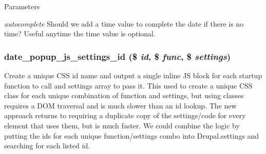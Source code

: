 \begin{DoxyParams}{Parameters}
\item[{\em autocomplete}]Should we add a time value to complete the date if there is no time? Useful anytime the time value is optional. \end{DoxyParams}
\hypertarget{date__popup_8module_a8077608506edf747245df8c1192706c8}{
\subsubsection[{date\_\-popup\_\-js\_\-settings\_\-id}]{\setlength{\rightskip}{0pt plus 5cm}date\_\-popup\_\-js\_\-settings\_\-id (\$ {\em id}, \/  \$ {\em func}, \/  \$ {\em settings})}}
\label{date__popup_8module_a8077608506edf747245df8c1192706c8}
Create a unique CSS id name and output a single inline JS block for each startup function to call and settings array to pass it. This used to create a unique CSS class for each unique combination of function and settings, but using classes requires a DOM traversal and is much slower than an id lookup. The new approach returns to requiring a duplicate copy of the settings/code for every element that uses them, but is much faster. We could combine the logic by putting the ids for each unique function/settings combo into Drupal.settings and searching for each listed id.


